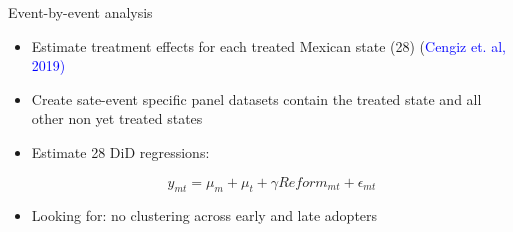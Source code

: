 \documentclass{beamer}
\begin{document}
\begin{frame}[label=event_by_event, noframenumbering]{Event-by-event analysis}
\begin{itemize}
 		  \setlength\itemsep{1em}   
	\item Estimate treatment effects for each treated Mexican state (28) (\textcolor{blue}{Cengiz et. al, 2019)}
	\item Create sate-event specific panel datasets contain the treated state and all other non yet treated states
	\item Estimate 28 DiD regressions: 

\begin{equation}
y_{mt}=\mu_m	 + \mu_t + \gamma Reform_{mt} + \epsilon_{mt}
\end{equation} 

	\item \alert{Looking for: no clustering across early and late adopters} 

\end{itemize}
  \hyperlink{identification2}{}  


\end{frame}
\end{document}
